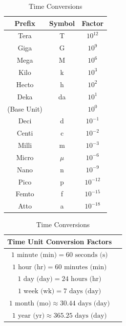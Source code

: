 \documentclass{article}
\begin{document}
\begin{table}
\begin{minipage}[t]{0.48\linewidth}
        \begin{tabular}{|c|c|c|}
            \hline
            \textbf{Prefix} & \textbf{Symbol} & \textbf{Factor} \\
            \hline
            Tera & T & $10^{12}$ \\
            Giga & G & $10^9$ \\
            Mega & M & $10^6$ \\
            Kilo & k & $10^3$ \\
            Hecto & h & $10^2$ \\
            Deka & da & $10^1$ \\
            \hline
            (Base Unit) &  & $10^0$ \\
            \hline
            Deci & d & $10^{-1}$ \\
            Centi & c & $10^{-2}$ \\
            Milli & m & $10^{-3}$ \\
            Micro & $\mu$ & $10^{-6}$ \\
            Nano & n & $10^{-9}$ \\
            Pico & p & $10^{-12}$ \\
            Femto & f & $10^{-15}$ \\
            Atto & a & $10^{-18}$ \\
            \hline
        \end{tabular}
        \caption{Common Metric Prefixes}
        \label{tab:metric_prefixes}
        \vspace{1cm}
        \begin{tabular}{|c|c|}
            \hline
            \textbf{Time Unit Conversion Factors} \\
            \hline
            $1 \text{ minute (min)} = 60 \text{ seconds (s)}$ \\
            $1 \text{ hour (hr)} = 60 \text{ minutes (min)}$ \\
            $1 \text{ day (day)} = 24 \text{ hours (hr)}$ \\
            $1 \text{ week (wk)} = 7 \text{ days (day)}$ \\
            $1 \text{ month (mo)} \approx 30.44 \text{ days (day)}$ \\
            $1 \text{ year (yr)} \approx 365.25 \text{ days (day)}$ \\
            \hline
        \end{tabular}
        \caption{Time Conversions}
        \label{tab:time_conversions}
    \end{minipage}
\end{table}
\end{document}
